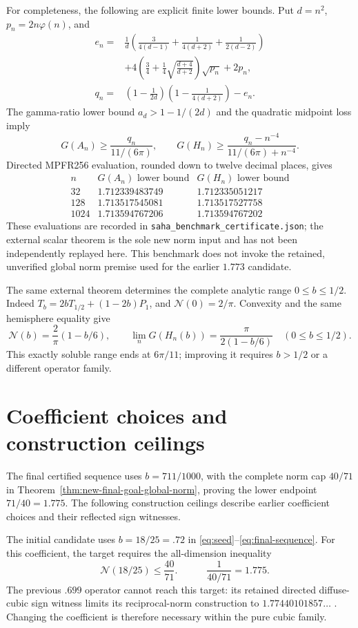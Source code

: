 \documentclass[11pt]{article}
\newcommand{\N}{\mathcal N}
\begin{document}
For completeness, the following are explicit finite lower bounds.
Put $d=n^2$, $p_n=2n\varphi(n)$, and
\begin{align*}
 e_n={}&\frac1d\left(\frac{3}{4(d-1)}+
             \frac1{4(d+2)}+\frac1{2(d-2)}\right)\\
 &+4\left(\frac34+\frac14\sqrt{\frac{d+4}{d+2}}\right)
       \sqrt{p_n}+2p_n,\\
 q_n={}&\left(1-\frac1{2d}\right)
             \left(1-\frac1{4(d+2)}\right)-e_n.
\end{align*}
The gamma-ratio lower bound $a_d>1-1/(2d)$ and the quadratic
midpoint loss imply
\[
 G(A_n)\geq\frac{q_n}{11/(6\pi)},\qquad
 G(H_n)\geq\frac{q_n-n^{-4}}{11/(6\pi)+n^{-4}}.
\]
Directed MPFR256 evaluation, rounded down to twelve decimal places,
gives
\[
\begin{array}{c|cc}
 n & G(A_n)\text{ lower bound} & G(H_n)\text{ lower bound}\\\hline
 32&1.712339483749&1.712335051217\\
 128&1.713517545081&1.713517527758\\
 1024&1.713594767206&1.713594767202
\end{array}
\]
These evaluations are recorded in
\texttt{saha\_benchmark\_certificate.json}; the external scalar
theorem is the sole new norm input and has not been independently
replayed here.  This benchmark does not invoke the retained, unverified
global norm premise used for the earlier $1.773$ candidate.

The same external theorem determines the complete analytic range
$0\le b\le1/2$. Indeed
$T_b=2bT_{1/2}+(1-2b)P_1$, and $\N(0)=2/\pi$.
Convexity and the same hemisphere equality give
\[
 \N(b)=\frac2\pi(1-b/6),\qquad
 \lim_nG(H_n(b))=\frac{\pi}{2(1-b/6)}
 \quad(0\le b\le1/2).
\]
This exactly soluble range ends at $6\pi/11$; improving it requires
$b>1/2$ or a different operator family.

\section{Coefficient choices and construction ceilings}
The final certified sequence uses $b=711/1000$, with the complete norm
cap $40/71$ in Theorem~\ref{thm:new-final-goal-global-norm}, proving the
lower endpoint $71/40=1.775$. The following construction ceilings describe
earlier coefficient choices and their reflected sign witnesses.

The initial candidate uses $b=18/25=.72$ in
\eqref{eq:seed}--\eqref{eq:final-sequence}. For this coefficient,
the target requires the all-dimension inequality
\begin{equation}\label{eq:target}
 \boxed{\quad\N(18/25)\le\frac{40}{71}.
 \quad}\qquad \frac1{40/71}=1.775.
\end{equation}
The previous $.699$ operator cannot reach this target: its retained
directed diffuse-cubic sign witness limits its reciprocal-norm construction
to $1.77440101857\ldots$ \cite{history}. Changing the coefficient is
therefore necessary within the pure cubic family.
\end{document}
